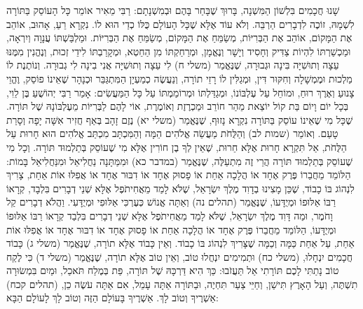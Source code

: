 שָׁנוּ חֲכָמִים בִּלְשׁוֹן הַמִּשְׁנָה, בָּרוּךְ שֶׁבָּחַר בָּהֶם וּבְמִשְׁנָתָם: רַבִּי מֵאִיר אוֹמֵר כָּל הָעוֹסֵק בַּתּוֹרָה לִשְׁמָהּ, זוֹכֶה לִדְבָרִים הַרְבֵּה. וְלֹא עוֹד אֶלָּא שֶׁכָּל הָעוֹלָם כֻּלּוֹ כְדַי הוּא לוֹ. נִקְרָא רֵעַ, אָהוּב, אוֹהֵב אֶת הַמָּקוֹם, אוֹהֵב אֶת הַבְּרִיּוֹת, מְשַׂמֵּחַ אֶת הַמָּקוֹם, מְשַׂמֵּחַ אֶת הַבְּרִיּוֹת. וּמַלְבַּשְׁתּוֹ עֲנָוָה וְיִרְאָה, וּמַכְשַׁרְתּוֹ לִהְיוֹת צַדִּיק וְחָסִיד וְיָשָׁר וְנֶאֱמָן, וּמְרַחַקְתּוֹ מִן הַחֵטְא, וּמְקָרַבְתּוֹ לִידֵי זְכוּת, וְנֶהֱנִין מִמֶּנּוּ עֵצָה וְתוּשִׁיָּה בִּינָה וּגְבוּרָה, שֶׁנֶּאֱמַר (משלי ח) לִי עֵצָה וְתוּשִׁיָּה אֲנִי בִינָה לִי גְבוּרָה. וְנוֹתֶנֶת לוֹ מַלְכוּת וּמֶמְשָׁלָה וְחִקּוּר דִּין, וּמְגַלִּין לוֹ רָזֵי תוֹרָה, וְנַעֲשֶׂה כְמַעְיָן הַמִּתְגַּבֵּר וּכְנָהָר שֶׁאֵינוֹ פוֹסֵק, וֶהֱוֵי צָנוּעַ וְאֶרֶךְ רוּחַ, וּמוֹחֵל עַל עֶלְבּוֹנוֹ, וּמְגַדַּלְתּוֹ וּמְרוֹמַמְתּוֹ עַל כָּל הַמַּעֲשִׂים:
אָמַר רַבִּי יְהוֹשֻׁעַ בֶּן לֵוִי, בְּכָל יוֹם וָיוֹם בַּת קוֹל יוֹצֵאת מֵהַר חוֹרֵב וּמַכְרֶזֶת וְאוֹמֶרֶת, אוֹי לָהֶם לַבְּרִיּוֹת מֵעֶלְבּוֹנָהּ שֶׁל תּוֹרָה. שֶׁכָּל מִי שֶׁאֵינוֹ עוֹסֵק בַּתּוֹרָה נִקְרָא נָזוּף, שֶׁנֶּאֱמַר (משלי יא) נֶזֶם זָהָב בְּאַף חֲזִיר אִשָּׁה יָפָה וְסָרַת טָעַם. וְאוֹמֵר (שמות לב) וְהַלֻּחֹת מַעֲשֵׂה אֱלֹהִים הֵמָּה וְהַמִּכְתָּב מִכְתַּב אֱלֹהִים הוּא חָרוּת עַל הַלֻּחֹת, אַל תִּקְרָא חָרוּת אֶלָּא חֵרוּת, שֶׁאֵין לְךָ בֶן חוֹרִין אֶלָּא מִי שֶׁעוֹסֵק בְּתַלְמוּד תּוֹרָה. וְכָל מִי שֶׁעוֹסֵק בְּתַלְמוּד תּוֹרָה הֲרֵי זֶה מִתְעַלֶּה, שֶׁנֶּאֱמַר (במדבר כא) וּמִמַּתָּנָה נַחֲלִיאֵל וּמִנַּחֲלִיאֵל בָּמוֹת:
הַלּוֹמֵד מֵחֲבֵרוֹ פֶּרֶק אֶחָד אוֹ הֲלָכָה אַחַת אוֹ פָסוּק אֶחָד אוֹ דִבּוּר אֶחָד אוֹ אֲפִלּוּ אוֹת אַחַת, צָרִיךְ לִנְהוֹג בּוֹ כָבוֹד, שֶׁכֵּן מָצִינוּ בְדָוִד מֶלֶךְ יִשְׂרָאֵל, שֶׁלֹּא לָמַד מֵאֲחִיתֹפֶל אֶלָּא שְׁנֵי דְבָרִים בִּלְבָד, קְרָאוֹ רַבּוֹ אַלּוּפוֹ וּמְיֻדָּעוֹ, שֶׁנֶּאֱמַר (תהלים נה) וְאַתָּה אֱנוֹשׁ כְּעֶרְכִּי אַלּוּפִי וּמְיֻדָּעִי. וַהֲלֹא דְבָרִים קַל וָחֹמֶר, וּמַה דָּוִד מֶלֶךְ יִשְׂרָאֵל, שֶׁלֹּא לָמַד מֵאֲחִיתֹפֶל אֶלָּא שְׁנֵי דְבָרִים בִּלְבַד קְרָאוֹ רַבּוֹ אַלּוּפוֹ וּמְיֻדָּעוֹ, הַלּוֹמֵד מֵחֲבֵרוֹ פֶּרֶק אֶחָד אוֹ הֲלָכָה אַחַת אוֹ פָסוּק אֶחָד אוֹ דִבּוּר אֶחָד אוֹ אֲפִלּוּ אוֹת אַחַת, עַל אַחַת כַּמָּה וְכַמָּה שֶׁצָּרִיךְ לִנְהוֹג בּוֹ כָבוֹד. וְאֵין כָּבוֹד אֶלָּא תוֹרָה, שֶׁנֶּאֱמַר (משלי ג) כָּבוֹד חֲכָמִים יִנְחָלוּ, (משלי כח) וּתְמִימִים יִנְחֲלוּ טוֹב, וְאֵין טוֹב אֶלָּא תוֹרָה, שֶׁנֶּאֱמַר (משלי ד) כִּי לֶקַח טוֹב נָתַתִּי לָכֶם תּוֹרָתִי אַל תַּעֲזֹבוּ:
כַּךְ הִיא דַּרְכָּהּ שֶׁל תּוֹרָה, פַּת בְּמֶלַח תֹּאכַל, וּמַיִם בִּמְשׂוּרָה תִשְׁתֶּה, וְעַל הָאָרֶץ תִּישַׁן, וְחַיֵּי צַעַר תִּחְיֶה, וּבַתּוֹרָה אַתָּה עָמֵל, אִם אַתָּה עֹשֶׂה כֵן, (תהלים קכח) אַשְׁרֶיךָ וְטוֹב לָךְ. אַשְׁרֶיךָ בָּעוֹלָם הַזֶּה וְטוֹב לָךְ לָעוֹלָם הַבָּא:
